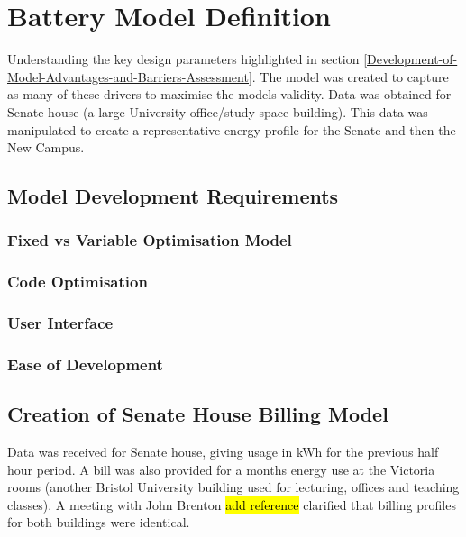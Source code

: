 \newpage

\section{Battery Model Definition}\label{battery-model-definition}

Understanding the key design parameters highlighted in section
\ref{Development-of-Model-Advantages-and-Barriers-Assessment}. The model
was created to capture as many of these drivers to maximise the models
validity. Data was obtained for Senate house (a large University
office/study space building). This data was manipulated to create a
representative energy profile for the Senate and then the New Campus.

\subsection{Model Development
Requirements}\label{model-development-requirements}

\subsubsection{Fixed vs Variable Optimisation
Model}\label{fixed-vs-variable-optimisation-model}

\subsubsection{Code Optimisation}\label{code-optimisation}

\subsubsection{User Interface}\label{user-interface}

\subsubsection{Ease of Development}\label{ease-of-development}

\subsection{Creation of Senate House Billing
Model}\label{creation-of-senate-house-billing-model}

Data was received for Senate house, giving usage in kWh for the previous
half hour period. A bill was also provided for a months energy use at
the Victoria rooms (another Bristol University building used for
lecturing, offices and teaching classes). A meeting with John Brenton
\hl{add reference} clarified that billing profiles for both buildings
were identical.


